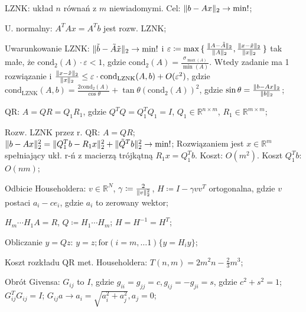 
\entry
LZNK: układ $n$ równań z $m$ niewiadomymi.
Cel: $\|b - Ax\|_2 \to \min !$;

\entry
U. normalny:
$A^TAx=A^Tb$
jest rozw. LZNK;

\entry
Uwarunkowanie LZNK:
$\|\tilde{b} - \tilde{A}\tilde{x}\|_2 \to \mathrm{min}!$
i $\varepsilon\coloneqq \max\set{ \frac{\|A - \tilde{A}\|_2}{\|A\|_2}, \frac{\|x - \tilde{x}\|_2}{\|x\|_2} }$
tak małe, że $\mathrm{cond}_2(A)\cdot \varepsilon < 1$,
gdzie $\mathrm{cond}_2(A) = \frac{\sigma_{\max(A)}}{\min(A)}$.
Wtedy zadanie ma 1 rozwiązanie i
$\frac{\|x-\tilde{x}\|_2}{\|x\|_2} \leq  \varepsilon \cdot \mathrm{cond}_{\mathrm{LZNK}}(A,b)+ O(\varepsilon^2)$,
gdzie $\mathrm{cond}_{\mathrm{LZNK}}(A,b) = \frac{2\mathrm{cond}_2(A)}{\cos\theta} + \tan\theta(\mathrm{cond}_2(A))^2$,
gdzie $\sin\theta=\frac{\|b-Ax\|_2}{\|b\|_2}$;

\entry
QR:
$A = QR = Q_1R_1$,
gdzie
$Q^TQ=Q^T_1Q_1=I$,
$Q_1\in\mathbb{R}^{n\times m}$,
$R_1\in\mathbb{R}^{m\times m}$;

\entry
Rozw. LZNK przez r. QR:
$A=QR$;
$\|b-Ax\|^2_2 = \|Q^T_1b-R_1x\|^2_2 + \|\tilde{Q}^Tb\|^2_2 \to \min !$;
Rozwiązaniem jest $x\in \mathbb{R}^m$ spełniający ukł. r-ń z macierzą trójkątną $R_1x=Q_1^Tb$.
Koszt: $O(m^2)$.
Koszt $Q_1^Tb$: $O(nm)$;


\entry
Odbicie Householdera:
$v\in \mathbb{R}^N$,
$\gamma \coloneqq \frac{2}{\|v\|^2_2} $,
$H\coloneqq I-\gamma vv^T$ ortogonalna, gdzie
$v$ postaci $a_i-ce_i$,
gdzie $a_i$ to zerowany wektor;

\entry
$H_m \cdots H_1 A = R$, $Q \coloneqq H_1 \cdots H_m$;
\entry
$H=H^{-1}=H^T$;

\entry
Obliczanie $y=Qz$:
$y=z; \mathrm{for}(i=m,\ldots 1)\{y=H_iy\}$;

\entry
Koszt rozkładu QR met. Householdera: $T(n,m)=2m^2n - \frac{2}{3}m^3$;

\entry
Obrót Givensa:
$G_{ij}$ to $I$,
gdzie
$g_{ii}=g_{jj}=c, g_{ij}=-g_{ji}=s$,
gdzie
$c^2+s^2=1$;
\entry
$G_{ij}^TG_{ij}=I$;
\entry
$G_{ij}a \to a_i=\sqrt{a_i^2 + a_j^2}, a_j=0$;

